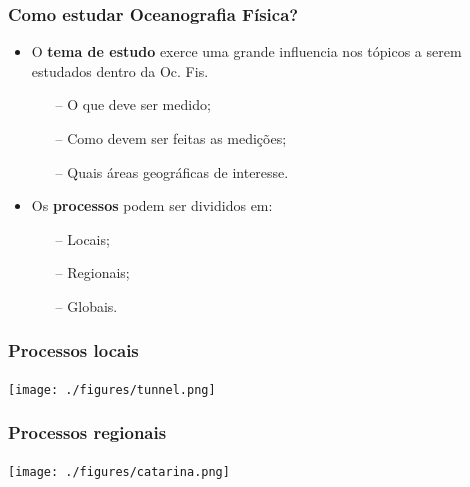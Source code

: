 \begin{frame}
    \frametitle{Como estudar Oceanografia Física?}
    \begin{itemize}[<+-| alert@+>]
        \item O {\bf tema de estudo} exerce uma grande influencia nos tópicos a
              serem estudados dentro da Oc. Fis.
            \begin{enumerate}[<+-| alert@+>]
                \item[--]O que deve ser medido;
                \item[--]Como devem ser feitas as medições;
                \item[--]Quais áreas geográficas de interesse.
            \end{enumerate}
        \item Os {\bf processos} podem ser divididos em:
            \begin{enumerate}[<+-| alert@+>]
                \item[--]Locais;
                \item[--]Regionais;
                \item[--]Globais.
            \end{enumerate}
    \end{itemize}
\end{frame}

\begin{frame}
    \frametitle{Processos locais}
    \begin{center}
      \texttt{[image: ./figures/tunnel.png]}
    \end{center}
\end{frame}

\begin{frame}
    \frametitle{Processos regionais}
    \begin{center}
      \texttt{[image: ./figures/catarina.png]}
    \end{center}
\end{frame}

